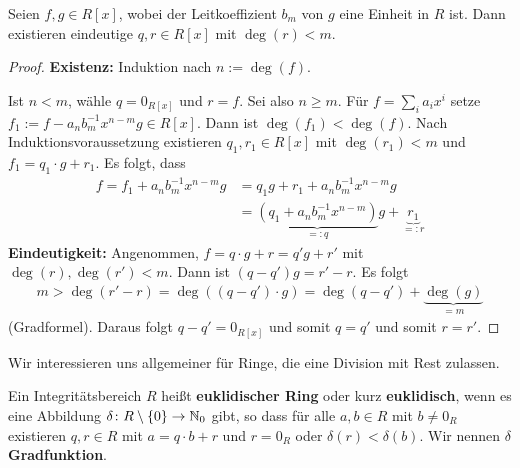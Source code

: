 \begin{satz}\label{satz5_10}
	Seien $f,g \in R[x]$, wobei der Leitkoeffizient $b_m$ von $g$ eine Einheit in $R$ ist. Dann existieren eindeutige $q,r \in R[x]$ mit $\deg(r) < m$.
\end{satz}
\begin{proof}
	\textbf{Existenz: } Induktion nach $n := \deg(f)$.
	
	Ist $n < m$, wähle $q = 0_{R[x]}$ und $r=f$. Sei also $n \geq m$. Für $f = \sum_i a_i x^i$ setze $f_1 := f - a_n b_m^{-1} x^{n-m} g \in R[x]$. Dann ist $\deg(f_1) < \deg(f)$. Nach Induktionsvoraussetzung existieren $q_1, r_1 \in R[x]$ mit $\deg(r_1) < m$ und $f_1 = q_1 \cdot g + r_1$. Es folgt, dass 
	\begin{align*}
	f = f_1 + a_n b_m^{-1} x^{n-m} g &= q_1 g + r_1 + a_n b_m^{-1} x^{n-m} g\\
	&= 	\underbrace{(q_1 + a_n b_m^{-1} x^{n-m})}_{=: q} g + \underbrace{r_1}_{=:r}
	\end{align*}
	\textbf{Eindeutigkeit: } Angenommen, $f = q\cdot g + r = q' g + r'$ mit $\deg(r), \deg(r') < m$. Dann ist $(q- q')g = r' - r$. Es folgt 
	\begin{align*}
		m > \deg(r'-r) = \deg((q - q')\cdot g) = \deg(q-q') + \underbrace{\deg(g)}_{=m}
	\end{align*}
	(Gradformel). Daraus folgt $q-q' = 0_{R[x]}$ und somit $q = q'$ und somit $r=r'$.
\end{proof}
Wir interessieren uns allgemeiner für Ringe, die eine Division mit Rest zulassen.
\begin{definition}
	Ein Integritätsbereich $R$ heißt \textbf{euklidischer Ring} oder kurz \textbf{euklidisch}, wenn es eine Abbildung $\delta \colon R \setminus \{0\} \to \mathbb{N}_0$ gibt, so dass für alle $a,b \in R$ mit $b\neq 0_R$ existieren $q,r \in R$ mit $a = q\cdot b + r$ und $r= 0_R$ oder $\delta(r) < \delta(b)$. Wir nennen $\delta$ \textbf{Gradfunktion}.
\end{definition}

